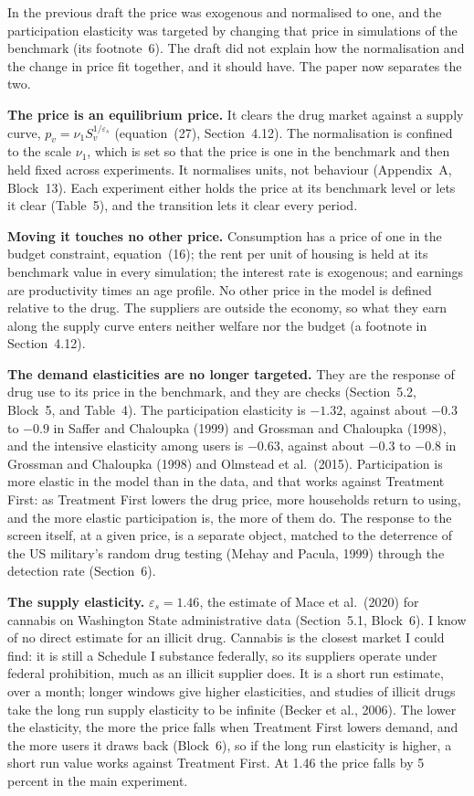\documentclass[11pt]{article}
\begin{document}
\begin{response}
In the previous draft the price was exogenous and normalised to one, and the
participation elasticity was targeted by changing that price in simulations of the
benchmark (its footnote~6). The draft did not explain how the normalisation and the
change in price fit together, and it should have. The paper now separates the two.

\textbf{The price is an equilibrium price.} It clears the drug market against a supply
curve, $p_v=\nu_1 S_v^{1/\varepsilon_s}$ (equation~(27), Section~4.12). The
normalisation is confined to the scale $\nu_1$, which is set so that the price is one
in the benchmark and then held fixed across experiments. It normalises units, not
behaviour (Appendix~A, Block~13). Each experiment either holds the price at its
benchmark level or lets it clear (Table~5), and the transition lets it clear every
period.

\textbf{Moving it touches no other price.} Consumption has a price of one in the
budget constraint, equation~(16); the rent per unit of housing is held at its benchmark
value in every simulation; the interest rate is exogenous; and earnings are
productivity times an age profile. No other price in the model is defined relative to
the drug. The suppliers are outside the economy, so what they earn along the supply
curve enters neither welfare nor the budget (a footnote in Section~4.12).

\textbf{The demand elasticities are no longer targeted.} They are the response of drug
use to its price in the benchmark, and they are checks (Section~5.2, Block~5, and
Table~4). The participation elasticity is $-1.32$, against about $-0.3$ to $-0.9$ in
Saffer and Chaloupka (1999) and Grossman and Chaloupka (1998), and the intensive
elasticity among users is $-0.63$, against about $-0.3$ to $-0.8$ in Grossman and
Chaloupka (1998) and Olmstead et al.\ (2015). Participation is more elastic in the
model than in the data, and that works against Treatment First: as Treatment First
lowers the drug price, more households return to using, and the more elastic
participation is, the more of them do. The response to the screen itself, at a given
price, is a separate object, matched to the deterrence of the US military's random
drug testing (Mehay and Pacula, 1999) through the detection rate (Section~6).

\textbf{The supply elasticity.} $\varepsilon_s=1.46$, the estimate of Mace et al.\
(2020) for cannabis on Washington State administrative data (Section~5.1, Block~6). I
know of no direct estimate for an illicit drug. Cannabis is the closest market I could
find: it is still a Schedule I substance federally, so its suppliers operate under
federal prohibition, much as an illicit supplier does. It is a short run estimate,
over a month; longer windows give higher elasticities, and studies of illicit drugs
take the long run supply elasticity to be infinite (Becker et al., 2006). The lower the
elasticity, the more the price falls when Treatment First lowers demand, and the more
users it draws back (Block~6), so if the long run elasticity is higher, a short run
value works against Treatment First. At 1.46 the
price falls by 5 percent in the main experiment.


\end{response}
\end{document}

